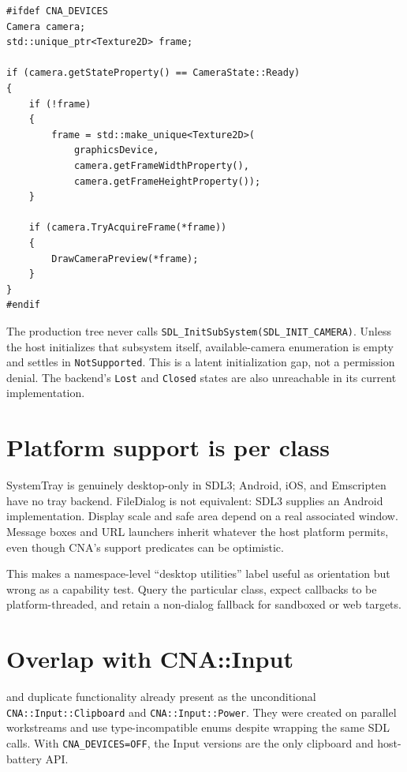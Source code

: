 \begin{lstlisting}
#ifdef CNA_DEVICES
Camera camera;
std::unique_ptr<Texture2D> frame;

if (camera.getStateProperty() == CameraState::Ready)
{
    if (!frame)
    {
        frame = std::make_unique<Texture2D>(
            graphicsDevice,
            camera.getFrameWidthProperty(),
            camera.getFrameHeightProperty());
    }

    if (camera.TryAcquireFrame(*frame))
    {
        DrawCameraPreview(*frame);
    }
}
#endif
\end{lstlisting}

The production tree never calls \texttt{SDL\_InitSubSystem(SDL\_INIT\_CAMERA)}. Unless the
host initializes that subsystem itself, available-camera enumeration is empty and
 settles in \texttt{NotSupported}. This is a latent initialization gap, not a
permission denial. The backend's \texttt{Lost} and \texttt{Closed} states are also unreachable
in its current implementation.

\section{Platform support is per class}

SystemTray is genuinely desktop-only in SDL3; Android, iOS, and Emscripten have no tray backend.
FileDialog is not equivalent: SDL3 supplies an Android implementation. Display scale and safe
area depend on a real associated window. Message boxes and URL launchers inherit whatever the
host platform permits, even though CNA's support predicates can be optimistic.

This makes a namespace-level ``desktop utilities'' label useful as orientation but wrong as a
capability test. Query the particular class, expect callbacks to be platform-threaded, and
retain a non-dialog fallback for sandboxed or web targets.

\section{Overlap with CNA::Input}

 and  duplicate functionality already present as the
unconditional \texttt{CNA::Input::Clipboard} and \texttt{CNA::Input::Power}. They were created
on parallel workstreams and use type-incompatible enums despite wrapping the same SDL calls.
With \texttt{CNA\_DEVICES=OFF}, the Input versions are the only clipboard and host-battery API.

